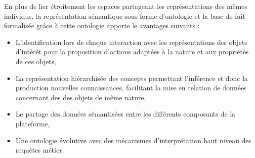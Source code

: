 
En plus de lier étroitement les espaces partageant les représentations des mêmes individus, la représentation sémantique sous forme d'ontologie et la base de fait formalisée grâce à cette ontologie apporte le avantages suivants :



\begin{itemize}
    \item L'identification lors de chaque interaction avec les représentations des objets d'intérêt pour la proposition d'actions adaptées à la nature et aux propriétés de ces objets, 
    \item La représentation hiérarchisée des concepts permettant l'inférence et donc la production nouvelles connaissances, facilitant la mise en relation de données concernant des des objets de même nature,  
    \item Le partage des données sémantisées entre les différents composants de la plateforme, 
    \item Une ontologie évolutive avec des mécanismes d'interprétation haut niveau des requêtes métier.
\end{itemize}


